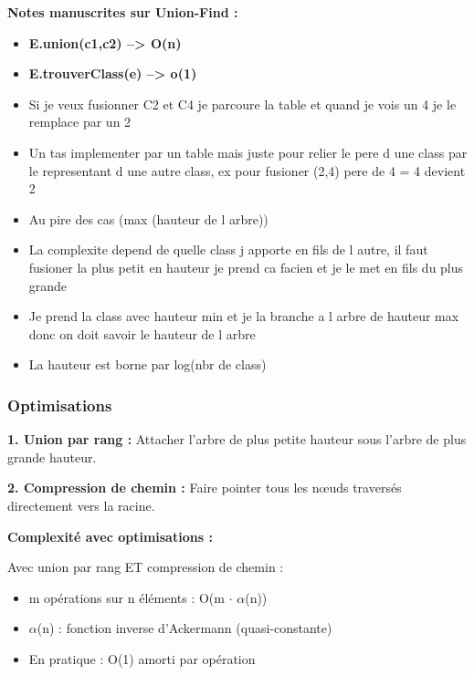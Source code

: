 \documentclass[12pt,a4paper]{article}
\begin{document}
\begin{notecours}
\textbf{Notes manuscrites sur Union-Find :}
\begin{itemize}
    \item \textbf{E.union(c1,c2) --> O(n)}
    \item \textbf{E.trouverClass(e) --> o(1)}
    \item Si je veux fusionner C2 et C4 je parcoure la table et quand je vois un 4 je le remplace par un 2
    \item Un tas implementer par un table mais juste pour relier le pere d une class par le representant d une autre class, ex pour fusioner (2,4) pere de 4 = 4 devient 2
    \item Au pire des cas (max (hauteur de l arbre))
    \item La complexite depend de quelle class j apporte en fils de l autre, il faut fusioner la plus petit en hauteur je prend ca facien et je le met en fils du plus grande
    \item Je prend la class avec hauteur min et je la branche a l arbre de hauteur max donc on doit savoir le hauteur de l arbre
    \item La hauteur est borne par log(nbr de class)
\end{itemize}
\end{notecours}

\subsubsection{Optimisations}

\begin{important}
\textbf{1. Union par rang :} Attacher l'arbre de plus petite hauteur sous l'arbre de plus grande hauteur.

\textbf{2. Compression de chemin :} Faire pointer tous les nœuds traversés directement vers la racine.
\end{important}

\begin{exemple}
\textbf{Complexité avec optimisations :}

Avec union par rang ET compression de chemin :
\begin{itemize}
    \item m opérations sur n éléments : \textcolor{defvert}{O(m $\cdot$ $\alpha$(n))}
    \item $\alpha$(n) : fonction inverse d'Ackermann (quasi-constante)
    \item En pratique : \textcolor{defvert}{O(1)} amorti par opération
\end{itemize}
\end{exemple}
\end{document}
